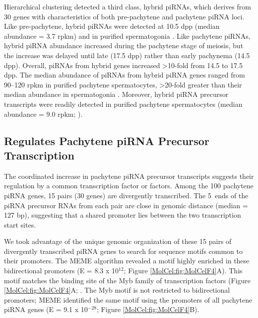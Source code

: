     Hierarchical clustering detected a third class, hybrid piRNAs, which derives from 30 genes with characteristics of both pre-pachytene and pachytene piRNA loci. Like pre-pachytene, hybrid piRNAs were detected at 10.5 dpp (median abundance = 3.7 rpkm) and in purified spermatogonia \citep{Gan2011}. Like pachytene piRNAs, hybrid piRNA abundance increased during the pachytene stage of meiosis, but the increase was delayed until late (17.5 dpp) rather than early pachynema (14.5 dpp). Overall, piRNAs from hybrid genes increased >10-fold from 14.5 to 17.5 dpp. The median abundance of piRNAs from hybrid piRNA genes ranged from 90–120 rpkm in purified pachytene spermatocytes, >20-fold greater than their median abundance in spermatogonia \citep{Gan2011,Modzelewski2012}. Moreover, hybrid piRNA precursor transcripts were readily detected in purified pachytene spermatocytes (median abundance = 9.0 rpkm; \citep{Modzelewski2012}).

  \subsection{\amyb{} Regulates Pachytene piRNA Precursor Transcription}
    \label{MolCel:subsec:A-Myb controls Pachytene precursor Tx}

    The coordinated increase in pachytene piRNA precursor transcripts suggests their regulation by a common transcription factor or factors. Among the 100 pachytene piRNA genes, 15 pairs (30 genes) are divergently transcribed. The 5\textprime~ends of the piRNA precursor RNAs from each pair are close in genomic distance (median = 127 bp), suggesting that a shared promoter lies between the two transcription start sites.
     
    We took advantage of the unique genomic organization of these 15 pairs of divergently transcribed piRNA genes to search for sequence motifs common to their promoters. The MEME algorithm \citep{Bailey1994} revealed a motif highly enriched in these bidirectional promoters (E = 8.3 x 10$^{12}$; Figure \ref{MolCel:fig:MolCelF4}A). This motif matches the binding site of the Myb family of transcription factors (Figure \ref{MolCel:fig:MolCelF4}A; \citep{Gupta2007, Newburger2009}. The Myb motif is not restricted to bidirectional promoters; MEME identified the same motif using the promoters of all pachytene piRNA genes (E = 9.1 x 10$^{-28}$; Figure \ref{MolCel:fig:MolCelF4}B).

